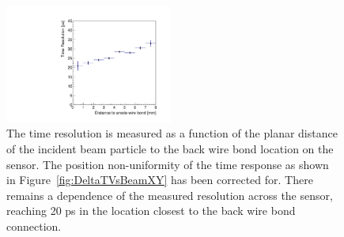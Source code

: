 \begin{figure}[htbp]
\centering 
\includegraphics[width=0.49\textwidth]{figures/TimeResolutionVsR.pdf} 
\caption{ The time resolution is measured as a function of the planar distance of the 
incident beam particle to the back wire bond location on the sensor. The position non-uniformity
of the time response as shown in Figure~\ref{fig:DeltaTVsBeamXY} has been corrected for. There 
remains a dependence of the measured resolution across the sensor, reaching 20 ps in the location
closest to the back wire bond connection.}
\label{fig:TimeResolutionVsR}
\end{figure}




